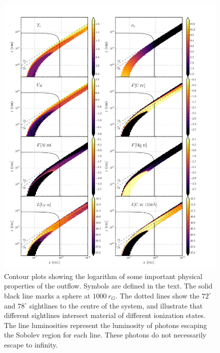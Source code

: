 \documentclass[useAMS,usenatbib]{mn2e_x}
\begin{document}
\begin{figure} %
\centering
\includegraphics[width=1.0\textwidth]{figures/link8.png}
\caption
{
Contour plots showing the logarithm of some important 
physical properties of the outflow. Symbols are defined in the text.
The solid black line marks a sphere at $1000~r_G$.
The dotted lines show the $72^\circ$ and $78^\circ$ sightlines 
to the centre of the system, and illustrate that different sightlines
intersect material of different ionization states.
The line luminosities represent the luminosity of photons
escaping the Sobolev region for each line. These photons do not
necessarily escape to infinity.
}
\label{fig:wind}
\end{figure} %
\end{document}
